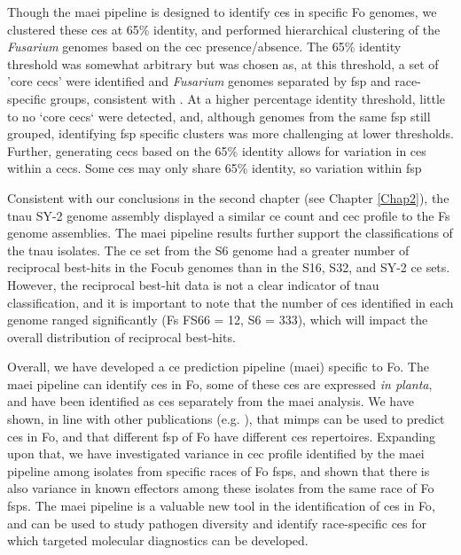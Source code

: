 Though the \ac{maei} pipeline is designed to identify \acp{ce} in specific \ac{Fo} genomes, we clustered these \acp{ce} at 65\% identity, and performed hierarchical clustering of the \textit{Fusarium} genomes based on the \ac{cec} presence/absence. The 65\% identity threshold was somewhat arbitrary but was chosen as, at this threshold, a set of 'core  \acp{cec}' were identified and \textit{Fusarium} genomes separated by \ac{fsp} and race-specific groups, consistent with \textcite{Dam2016,FoEC2}. At a higher percentage identity threshold, little to no `core \acp{cec}` were detected, and, although genomes from the same \ac{fsp} still grouped, identifying \ac{fsp} specific clusters was more challenging at lower thresholds. Further, generating \acp{cec} based on the 65\% identity allows for variation in \aclp{ce} within a \acp{cec}. Some \acp{ce} may only share 65\% identity, so variation within \ac{fsp}


Consistent with our conclusions in the second chapter (see Chapter \ref{Chap2}), the \ac{tnau} SY-2 genome assembly displayed a similar \ac{ce} count and \ac{cec} profile to the \ac{Fs} genome assemblies. The \ac{maei} pipeline results further support the classifications of the \ac{tnau} isolates. The \ac{ce} set from the S6 genome had a greater number of reciprocal best-hits in the \ac{Focub} genomes than in the S16, S32, and SY-2 \ac{ce} sets. However, the reciprocal best-hit data is not a clear indicator of \ac{tnau} classification, and it is important to note that the number of \acp{ce} identified in each genome ranged significantly (\ac{Fs} FS66 = 12, S6 = 333), which will impact the overall distribution of reciprocal best-hits. 

Overall, we have developed a \acl{ce} prediction pipeline (\ac{maei}) specific to \ac{Fo}. The \ac{maei} pipeline can identify \acp{ce} in \ac{Fo}, some of these \acp{ce} are expressed \textit{in planta}, and have been identified as \acp{ce} separately from the \ac{maei} analysis. We have shown, in line with other publications (e.g. \parencite{Schmidt2013, Dam2016, FoEC2}), that  \acp{mimp} can be used to predict \acp{ce} in \ac{Fo}, and that different \ac{fsp} of \ac{Fo} have different \acp{ce} repertoires. Expanding upon that, we have investigated variance in \ac{cec} profile identified by the \ac{maei} pipeline among isolates from specific races of \ac{Fo} \acp{fsp}, and shown that there is also variance in known effectors among these isolates from the same race of \ac{Fo} \acp{fsp}. The \ac{maei} pipeline is a valuable new tool in the identification of \acp{ce} in \ac{Fo}, and can be used to study pathogen diversity and identify race-specific \acp{ce} for which targeted molecular diagnostics can be developed. 